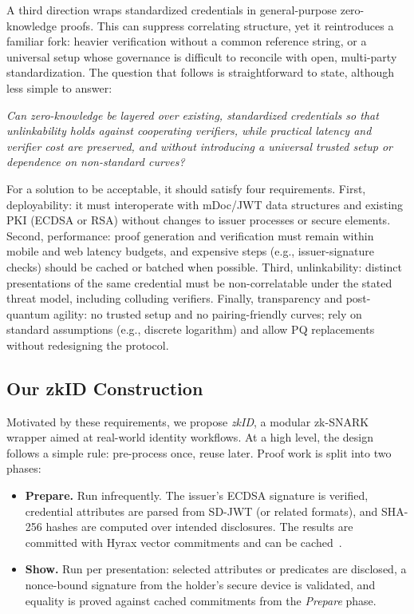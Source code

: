 A third direction wraps standardized credentials in general-purpose zero-knowledge proofs. This can suppress correlating structure, yet it reintroduces a familiar fork: heavier verification without a common reference string, or a universal setup whose governance is difficult to reconcile with open, multi-party standardization. The question that follows is straightforward to state, although less simple to answer:
\begin{center}
    \textit{Can zero-knowledge be layered over existing, standardized credentials so that unlinkability holds against cooperating verifiers, while practical latency and verifier cost are preserved, and without introducing a universal trusted setup or dependence on non-standard curves?}
\end{center}

For a solution to be acceptable, it should satisfy four requirements. First, deployability: it must interoperate with mDoc/JWT data structures and existing PKI (ECDSA or RSA) without changes to issuer processes or secure elements. Second, performance: proof generation and verification must remain within mobile and web latency budgets, and expensive steps (e.g., issuer-signature checks) should be cached or batched when possible. Third, unlinkability: distinct presentations of the same credential must be non-correlatable under the stated threat model, including colluding verifiers. Finally, transparency and post-quantum agility: no trusted setup and no pairing-friendly curves; rely on standard assumptions (e.g., discrete logarithm) and allow PQ replacements without redesigning the protocol.

\subsection{Our zkID Construction}

Motivated by these requirements, we propose \emph{zkID}, a modular zk-SNARK wrapper aimed at real-world identity workflows. At a high level, the design follows a simple rule: pre-process once, reuse later. Proof work is split into two phases:
\begin{itemize}
    \item \textbf{Prepare.} Run infrequently. The issuer’s ECDSA signature is verified, credential attributes are parsed from SD-JWT (or related formats), and SHA-256 hashes are computed over intended disclosures. The results are committed with Hyrax vector commitments and can be cached~\cite{cryptoeprint:2017/1132}.
    \item \textbf{Show.} Run per presentation: selected attributes or predicates are disclosed, a nonce-bound signature from the holder’s secure device is validated, and equality is proved against cached commitments from the \emph{Prepare} phase.
\end{itemize}

